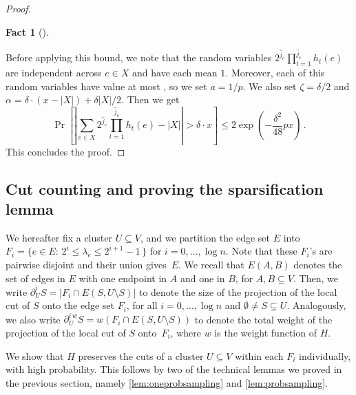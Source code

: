 \documentclass[epsfig,letter,11pt]{article}
\numberwithin{equation}{section}
\newcommand{\iuncut}[2]{{\partial}_{#2}^{i} #1}
\newcommand{\iwcut}[2]{{\partial}_{#2}^{i \,w} #1}
\renewcommand{\hat}{\widehat}
\newtheorem{fact}[theorem]{Fact}
\begin{document}
\begin{proof}
\begin{fact}[\cite{streamexpdec}]
\begin{equation*}
		\end{equation*}
	\end{fact}
	\noindent
	Before applying this bound, we note that the random variables $2^{\hat{j}_e}\prod_{t=1}^{\hat{j}_e}h_t(e)$ are independent across $e \in X$ and have each mean $1$. Moreover, each of this random variables have value at most \smash{$2^{\hat{j}_e} \le 2^{\lfloor \log \frac{1}{\min\{1,p\}}\rfloor}$}, so we set $a = 1/p$. We also set $\zeta = \delta/2$ and $\alpha = \delta\cdot (x-|X|)+\delta|X|/2$. Then we get
	\begin{equation*}
		\Pr\left[\left|\sum_{e \in X} 2^{\hat{j}_e}\prod_{t=1}^{\hat{j}_e}h_t(e) - |X|\right| > \delta \cdot x \right] \le 2 \exp\left(-\frac{\delta^2}{48}px\right) \, .
	\end{equation*}
	This concludes the proof.
\end{proof}

\subsection{Cut counting and proving the sparsification lemma}
\label{subsec:cutcounting}
We hereafter fix a cluster $U\subseteq V$, and we partition the edge set $E$ into $F_i = \{e \in E: \, 2^i \le \lambda_e \le 2^{i+1} -1 \, \}$ for $i =0,\dots,\log n$. Note that these $F_i$'s are pairwise disjoint and their union gives~$E$. We recall that $E(A,B)$ denotes the set of edges in $E$ with one endpoint in $A$ and one in $B$, for $A,B \subseteq V$. Then, we write $\iuncut{S}{U}=|F_i \cap E(S,U \setminus S)|$ to denote the size of the projection of the local cut of $S$ onto the edge set $F_i$, for all $i=0,\dots, \log n$ and $\emptyset \neq S \subsetneq U$. Analogously, we also write $\iwcut{S}{U}=w(F_i \cap E(S,U \setminus S))$ to denote the total weight of the projection of the local cut of $S$ onto~$F_i$, where $w$ is the weight function of $H$.

We show that $H$ preserves the cuts of a cluster $U \subseteq V$ within each $F_i$ individually, with high probability. This follows by two of the technical lemmas we proved in the previous section, namely \cref{lem:oneprobsampling} and \cref{lem:probsampling}.
\end{document}
